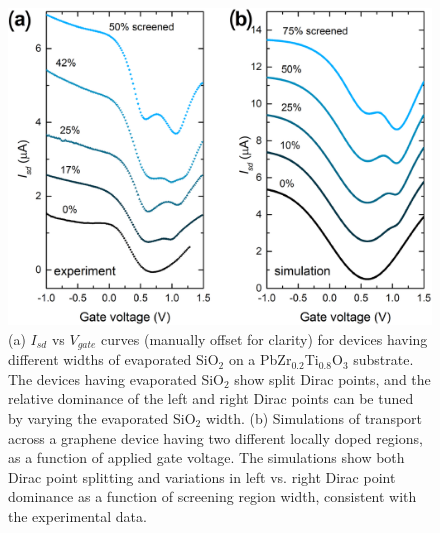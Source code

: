 \documentclass[edeposit,fullpage,draftthesis]{uiucthesis2009}
\begin{document}
\begin{figure}[!b]
  \centering
  \includegraphics[width=.8\textwidth]{images/resultsanddiscussion/pztpaper/figure2}

  \caption[I-V curves for graphene-ferroelectric pn junction devices]{
   (a) $I_{sd}$ vs $V_{gate}$ curves (manually offset for clarity) for devices having different widths of evaporated SiO$_2$ on a PbZr$_{0.2}$Ti$_{0.8}$O$_3$ substrate. The devices having evaporated SiO$_2$ show split Dirac points, and the relative dominance of the left and right Dirac points can be tuned by varying the evaporated SiO$_2$ width.
   (b) Simulations of transport across a graphene device having two different locally doped regions, as a function of applied gate voltage. The simulations show both Dirac point splitting and variations in left vs. right Dirac point dominance as a function of screening region width, consistent with the experimental data.
}
\label{fig:PZTdata}
\end{figure}
\end{document}
